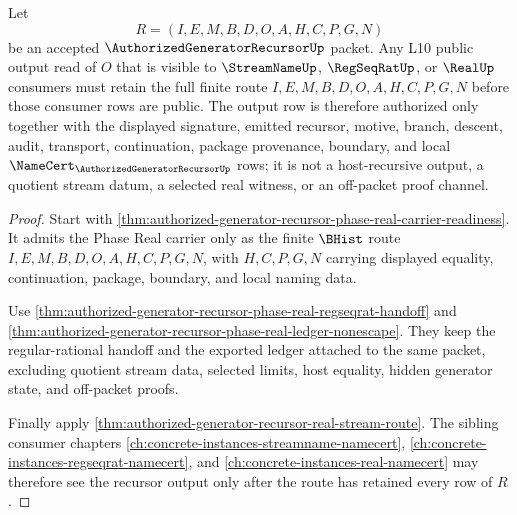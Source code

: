 \begin{theorem}
\label{thm:authorized-generator-recursor-l10-output-authorization-closure}
Let
$$
R=(I,E,M,B,D,O,A,H,C,P,G,N)
$$
be an accepted $\AuthorizedGeneratorRecursorUp$ packet. Any L10 public output read of $O$ that is visible to $\StreamNameUp$, $\RegSeqRatUp$, or $\RealUp$ consumers must retain the full finite route $I,E,M,B,D,O,A,H,C,P,G,N$ before those consumer rows are public. The output row is therefore authorized only together with the displayed signature, emitted recursor, motive, branch, descent, audit, transport, continuation, package provenance, boundary, and local $\NameCert_{\AuthorizedGeneratorRecursorUp}$ rows; it is not a host-recursive output, a quotient stream datum, a selected real witness, or an off-packet proof channel.
\end{theorem}
\begin{proof}
Start with \autoref{thm:authorized-generator-recursor-phase-real-carrier-readiness}. It admits the Phase Real carrier only as the finite $\BHist$ route $I,E,M,B,D,O,A,H,C,P,G,N$, with $H,C,P,G,N$ carrying displayed equality, continuation, package, boundary, and local naming data.

Use \autoref{thm:authorized-generator-recursor-phase-real-regseqrat-handoff} and \autoref{thm:authorized-generator-recursor-phase-real-ledger-nonescape}. They keep the regular-rational handoff and the exported ledger attached to the same packet, excluding quotient stream data, selected limits, host equality, hidden generator state, and off-packet proofs.

Finally apply \autoref{thm:authorized-generator-recursor-real-stream-route}. The sibling consumer chapters \autoref{ch:concrete-instances-streamname-namecert}, \autoref{ch:concrete-instances-regseqrat-namecert}, and \autoref{ch:concrete-instances-real-namecert} may therefore see the recursor output only after the route has retained every row of $R$.
\end{proof}

